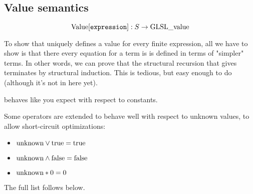 \documentclass{article}
\begin{document}

\subsection{Value semantics}

\[\textrm{Value}[\texttt{expression}]: S \to \textrm{GLSL\_value}\]

To show that  uniquely defines a value for every finite
expression, all we have to show is that there every equation for a
term is is defined in terms of "simpler" terms. In other words, we can
prove that the structural recursion that  gives terminates by
structural induction. This is tedious, but easy enough to do (although
it's not in here yet).

 behaves like you expect with respect to constants.

Some operators are extended to behave well with respect to unknown
values, to allow short-circuit optimizations:

\begin{itemize}
\item $\textrm{unknown} \lor \textrm{true} = \textrm{true}$
\item $\textrm{unknown} \land \textrm{false} = \textrm{false}$
\item $\textrm{unknown} * 0 = 0$
\end{itemize}

The full list follows below.
\end{document}
